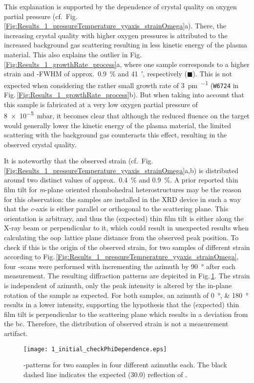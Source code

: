 This explanation is supported by the dependence of crystal quality on oxygen partial pressure (cf.\ Fig.\,\ref{Fig:Results_1_pressureTemperature_yyaxis_strainOmega}a).
There, the increasing crystal quality with higher oxygen pressures is attributed to the increased background gas scattering resulting in less kinetic energy of the plasma material.
This also explains the outlier in Fig.\,\ref{Fig:Results_1_growthRate_process}a, where one sample corresponds to a higher strain and \textomega-FWHM of approx.\ \qty{0.9}{\percent} and \qty{41}{\arcminute}, respectively ($\blacksquare$).
This is not expected when considering the rather small growth rate of \qty{3}{\pm\per\pulse} (\texttt{W6724} in Fig.\,\ref{Fig:Results_1_growthRate_process}b).
But when taking into account that this sample is fabricated at a very low oxygen partial pressure of \qty{8e-5}{\milli\bar}, it becomes clear that although the reduced fluence on the target would generally lower the kinetic energy of the plasma material, the limited scattering with the background gas counteracts this effect, resulting in the observed crystal quality.

It is noteworthy that the observed strain (cf.\ Fig.\,\ref{Fig:Results_1_pressureTemperature_yyaxis_strainOmega}a,b) is distributed around two distinct values of approx.\ \qty{0.4}{\percent} and \qty{0.9}{\percent}.
A prior reported thin film tilt for \textit{m}-plane oriented rhombohedral heterostructures
    \cite{kneiss2021}
may be the reason for this observation:
the samples are installed in the XRD device in such a way that the \textit{c}-axis is either parallel or orthogonal to the scattering plane.
This orientation is arbitrary, and thus the (expected) thin film tilt is either along the X-ray beam or perpendicular to it, which could result in unexpected results when calculating the \gls{oop}\ lattice plane distance from the observed peak position.
To check if this is the origin of the observed strain, for two samples of different strain according to Fig.\,\ref{Fig:Results_1_pressureTemperature_yyaxis_strainOmega}, four \thetaomega-scans were performed with incrementing the azimuth by \qty{90}{\degree} after each measurement.
The resulting diffraction patterns are depicited in Fig.\,\ref{Fig:Results_1_checkPhi}.
The strain is independent of azimuth, only the peak intensity is altered by the in-plane rotation of the sample as expected.
For both samples, an azimuth of \qtylist{0;180}{\degree} results in a lower intensity, supporting the hypothesis that the (expected) thin film tilt is perpendicular to the scattering plane which results in a deviation from the \gls{bc}.
Therefore, the distribution of observed strain is not a measurement artifact.
\begin{figure}
    \centering
    \texttt{[image: 1\_initial\_checkPhiDependence.eps]}
    \caption{
        \thetaomega-patterns for two samples in four different azimuths each.
        The black dashed line indicates the expected (30.0) reflection of \cro.
        }
    \label{Fig:Results_1_checkPhi}
\end{figure}
